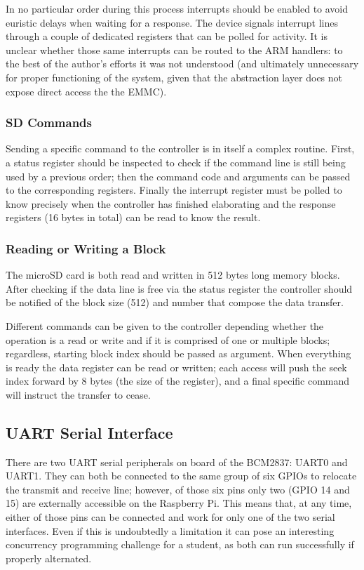 \documentclass[12pt,a4paper,openright,twoside]{report}
\begin{document}
In no particular order during this process interrupts should be enabled to 
avoid euristic delays when waiting for a response. The device signals interrupt
lines through a couple of dedicated registers that can be polled for activity. 
It is unclear whether those same interrupts can be routed to the ARM handlers:
to the best of the author's efforts it was not understood (and ultimately unnecessary
for proper functioning of the system, given that the abstraction layer does not
expose direct access the the EMMC).

\subsubsection{SD Commands}
Sending a specific command to the controller is in itself a complex routine. First,
a status register should be inspected to check if the command line is still being
used by a previous order; then the command code and arguments can be passed to 
the corresponding registers.
Finally the interrupt register must be polled to know precisely when the controller has
finished elaborating and the response registers (16 bytes in total) can be 
read to know the result.

\subsubsection{Reading or Writing a Block}
The microSD card is both read and written in 512 bytes long memory blocks. After
checking if the data line is free via the status register the controller should
be notified of the block size (512) and number that compose the data transfer.

Different commands can be given to the controller depending whether the operation
is a read or write and if it is comprised of one or multiple blocks; regardless,
starting block index should be passed as argument. When everything
is ready the data register can be read or written; each access will push the seek
index forward by 8 bytes (the size of the register), and a final specific command
will instruct the transfer to cease.


\subsection{UART Serial Interface}
\label{serial}
There are two UART serial peripherals on board of the BCM2837: UART0 and UART1.
They can both be connected to the same group of six GPIOs to relocate the 
transmit and receive line; however, of those six pins only two (GPIO 14 and 15)
are externally accessible on the Raspberry Pi. This means that, at any time,
either of those pins can be connected and work for only one of the two serial
interfaces.
Even if this is undoubtedly a limitation it can pose an interesting
concurrency programming challenge for a student, as both can run successfully if 
properly alternated.
\end{document}
